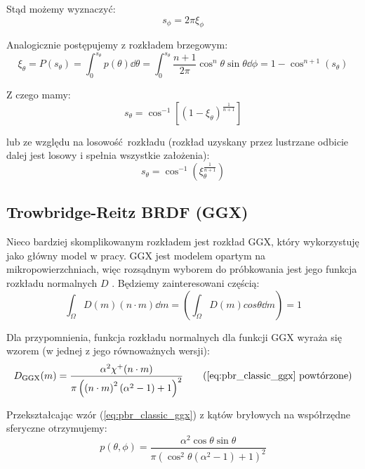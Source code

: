 \documentclass[../main.tex]{subfiles}
\begin{document}
Stąd możemy wyznaczyć:
\begin{equation}
	s_{\phi} = 2 \pi \xi_{\phi}
\end{equation}

Analogicznie postępujemy z rozkładem brzegowym:
\begin{equation}
  \xi_{\theta} = P(s_{\theta}) =
	\int_{0}^{s_{\theta}} {
		p(\theta) \dd \theta
	} =
	\int_{0}^{s_{\theta}} {
		\frac{n+1}{2\pi} \cos^{n}\theta \sin\theta \dd\phi
	} =
	1 - \cos^{n+1}(s_{\theta})
\end{equation}

Z czego mamy:
\begin{equation}
	s_{\theta} =
	\cos^{-1}\left[
		(1 - \xi_{\theta})^{\frac{1}{n+1}}
	\right]
\end{equation}

lub ze względu na losowość rozkładu (rozkład uzyskany przez lustrzane odbicie dalej jest losowy i spełnia wszystkie założenia):
\begin{equation}
	s_{\theta} =
	\cos^{-1}\left(
		\xi_{\theta}^{\frac{1}{n+1}}
	\right)
\end{equation}

\subsection{Trowbridge-Reitz BRDF (GGX)}

Nieco bardziej skomplikowanym rozkładem jest rozkład GGX, który wykorzystuję jako główny model w pracy. GGX jest modelem opartym na mikropowierzchniach, więc rozsądnym wyborem do próbkowania jest jego funkcja rozkładu normalnych $D$ \cite{NotesImportanceSampling}. Będziemy zainteresowani częścią:
\begin{equation}
  \int_{\Omega} D(m) (n \cdot m) \dd m = \left(\int_{\Omega} D(m) cos\theta \dd m\right) = 1
\end{equation}

Dla przypomnienia, funkcja rozkładu normalnych dla funkcji GGX wyraża się wzorem (w jednej z jego równoważnych wersji):
\begin{equation*}
D_{\text{GGX}}(m) =
\frac{
    \alpha^2 \chi^{+}(n \cdot m)
}{
    \pi \left(
    \left(n \cdot m \right)^{2}
    \left(\alpha^2 - 1 \right)
    + 1
    \right)^2
}
\tag{\ref{eq:pbr_classic_ggx} powtórzone}
\end{equation*}

Przekształcając wzór (\ref{eq:pbr_classic_ggx}) z kątów bryłowych na współrzędne sferyczne otrzymujemy:
\begin{equation}
  p(\theta, \phi) =
	\frac{
    \alpha^2 \cos\theta \sin\theta
	}{
    \pi \left(
      \cos^{2}\theta (\alpha^2 - 1) + 1
    \right)^{2}
  }
\end{equation}
\end{document}
